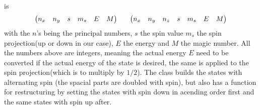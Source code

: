     is
        \begin{equation}
            \begin{aligned}
                \begin{pmatrix}
                    n_x & n_y & s & m_s & E & M
                \end{pmatrix}
                \indent
                \begin{pmatrix}
                    n_x & n_y & n_z & s & m_s & E & M
                \end{pmatrix}
            \end{aligned}
        \end{equation}
    with the $n$'s being the principal numbers, $s$ the spin value $m_s$ the
    spin projection(up or down in our case), $E$ the energy and $M$ the magic
    number. All the numbers above are integers, meaning the actual energy $E$
    need to be converted if the actual energy of the state is desired, the same
    is applied to the spin projection(which is to multiply by $1/2$). The
     class builds the states with alternating spin (the
    spacial parts are doubled with spin), but also has a function for
    restructuring by setting the states with spin down in acending order first
    and the same states with spin up after.


